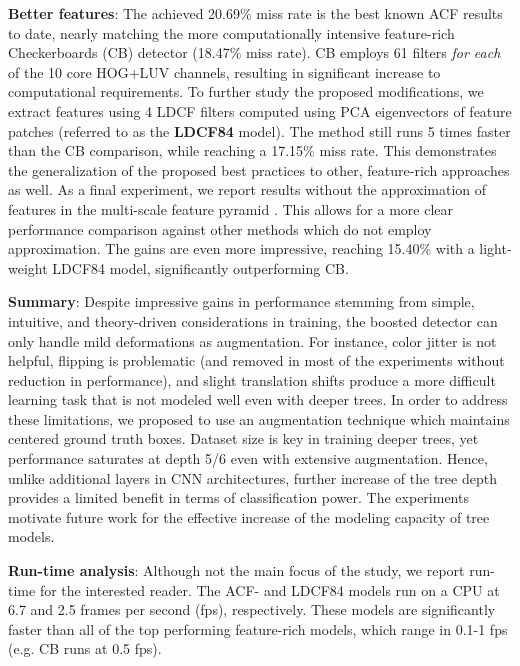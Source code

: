 \documentclass[a4paper,conference]{IEEEtran_icpr}
\begin{document}
  \textbf{Better features}: The achieved 20.69\% miss rate is the best known ACF results to date, nearly matching the more computationally intensive feature-rich Checkerboards (CB) detector \cite{zhang2015filtered} (18.47\% miss rate). CB employs 61 filters \textit{for each} of the 10 core HOG+LUV channels, resulting in significant increase to computational requirements. To further study the proposed modifications, we extract features using 4  LDCF filters \cite{ldcf} computed using PCA eigenvectors of feature patches (referred to as the \textbf{LDCF84} model). The method still runs 5 times faster than the CB comparison, while reaching a 17.15\% miss rate. This demonstrates the generalization of the proposed best practices to other, feature-rich approaches as well. As a final experiment, we report results without the approximation of features in the multi-scale feature pyramid \cite{DollarPAMI14pyramids}. This allows for a more clear performance comparison against other methods \cite{rotfilt,zhang2015filtered} which do not employ approximation. The gains are even more impressive, reaching 15.40\% with a light-weight LDCF84 model, significantly outperforming CB.


  
  \textbf{Summary}: Despite impressive gains in performance stemming from simple, intuitive, and theory-driven considerations in training, the boosted detector can only handle mild deformations as augmentation. For instance, color jitter is not helpful, flipping is problematic (and removed in most of the experiments without reduction in performance), and slight translation shifts produce a more difficult learning task that is not modeled well even with deeper trees. In order to address these limitations, we proposed to use an augmentation technique which maintains centered ground truth boxes. Dataset size is key in training deeper trees, yet performance saturates at depth 5/6 even with extensive augmentation. Hence, unlike additional layers in CNN architectures, further increase of the tree depth provides a limited benefit in terms of classification power. The experiments motivate future work for the effective increase of the modeling capacity of tree models. 
  
  \textbf{Run-time analysis}: Although not the main focus of the study, we report run-time for the interested reader. The ACF- and LDCF84 models run on a CPU at 6.7 and 2.5 frames per second (fps), respectively. These models are significantly faster than all of the top performing feature-rich models, which range in 0.1-1 fps (e.g. CB \cite{checkerboard} runs at 0.5 fps).
  
\end{document}
